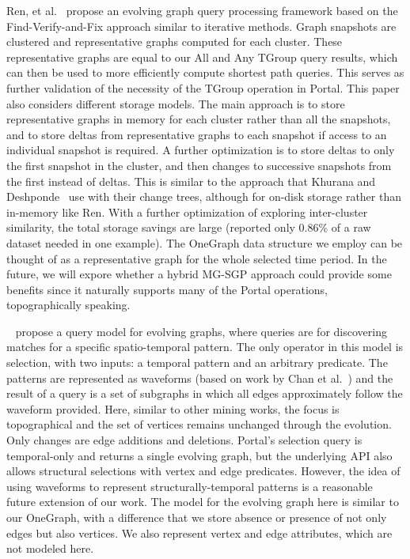 Ren, et al.~\cite{Ren2011} propose an evolving graph query processing
framework based on the Find-Verify-and-Fix approach similar to
iterative methods.  Graph snapshots are clustered and representative
graphs computed for each cluster.  These representative graphs are
equal to our All and Any TGroup query results, which can then be used
to more efficiently compute shortest path queries.  This serves as
further validation of the necessity of the TGroup operation in Portal.
This paper also considers different storage models.  The main approach
is to store representative graphs in memory for each cluster rather
than all the snapshots, and to store deltas from representative graphs
to each snapshot if access to an individual snapshot is required.  A
further optimization is to store deltas to only the first snapshot in
the cluster, and then changes to successive snapshots from the first
instead of deltas.  This is similar to the approach that Khurana and
Deshponde~\cite{Khurana2013} use with their change trees, although for
on-disk storage rather than in-memory like Ren.  With a further
optimization of exploring inter-cluster similarity, the total storage
savings are large (reported only 0.86\% of a raw dataset needed in one
example).  The OneGraph data structure we employ can be thought of as
a representative graph for the whole selected time period.  In the
future, we will expore whether a hybrid MG-SGP approach could provide
some benefits since it naturally supports many of the Portal
operations, topographically speaking.

~\cite{Kan2009} propose a query model for evolving graphs, where
queries are for discovering matches for a specific spatio-temporal
pattern.  The only operator in this model is selection, with two
inputs: a temporal pattern and an arbitrary predicate.  The patterns
are represented as waveforms (based on work by Chan et
al.~\cite{Chan2008}) and the result of a query is a set of subgraphs
in which all edges approximately follow the waveform provided.  Here,
similar to other mining works, the focus is topographical and the set
of vertices remains unchanged through the evolution. Only changes are
edge additions and deletions.  Portal's selection query is
temporal-only and returns a single evolving graph, but the underlying
API also allows structural selections with vertex and edge predicates.
However, the idea of using waveforms to represent
structurally-temporal patterns is a reasonable future extension of our
work.  The model for the evolving graph here is similar to our
OneGraph, with a difference that we store absence or presence of not
only edges but also vertices. We also represent vertex and edge
attributes, which are not modeled here.

